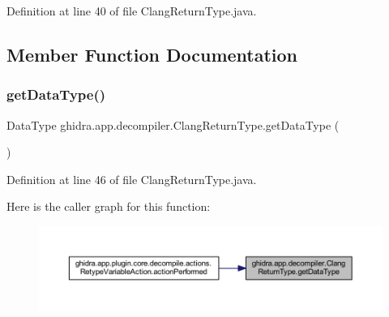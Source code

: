 Definition at line 40 of file Clang\+Return\+Type.\+java.



\subsection{Member Function Documentation}
\mbox{\label{classghidra_1_1app_1_1decompiler_1_1_clang_return_type_a3aff7f2d2da04f3d65ba7593bae01c85}} 
\subsubsection{\texorpdfstring{getDataType()}{getDataType()}}
{\footnotesize\ttfamily Data\+Type ghidra.\+app.\+decompiler.\+Clang\+Return\+Type.\+get\+Data\+Type (\begin{DoxyParamCaption}{ }\end{DoxyParamCaption})\hspace{0.3cm}{\ttfamily [inline]}}



Definition at line 46 of file Clang\+Return\+Type.\+java.

Here is the caller graph for this function\+:
\nopagebreak
\begin{figure}[H]
\begin{center}
\leavevmode
\includegraphics[width=350pt]{classghidra_1_1app_1_1decompiler_1_1_clang_return_type_a3aff7f2d2da04f3d65ba7593bae01c85_icgraph}
\end{center}
\end{figure}
\mbox{\label{classghidra_1_1app_1_1decompiler_1_1_clang_return_type_abc6aa2dfbf61e78a9950a82ccfaba62f}} 
